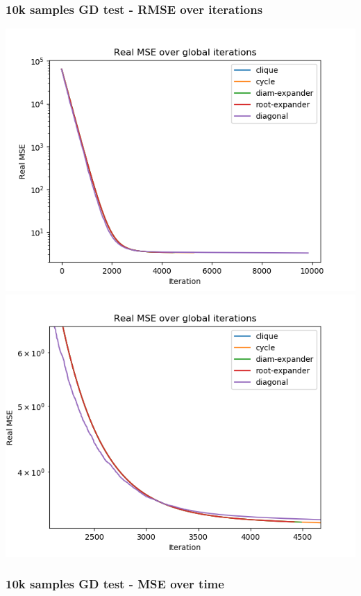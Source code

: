 \documentclass[11pt]{article}
\makeatletter
\def\maxwidth{\ifdim\Gin@nat@width>\linewidth\linewidth
    \else\Gin@nat@width\fi}
\let\Oldincludegraphics\includegraphics
\renewcommand{\includegraphics}[1]{\Oldincludegraphics[width=.8\maxwidth]{#1}}
\makeatother
\begin{document}
    \subsubsection{10k samples GD test - RMSE over
iterations}\label{k-samples-gd-test---rmse-over-iterations}

\includegraphics{media/img/tests/test_003_10ksamples_classic/2_real-mse_iter.png}
\includegraphics{media/img/tests/test_003_10ksamples_classic/2_real-mse_iter_zoom.png}

    \subsubsection{10k samples GD test - MSE over
time}\label{k-samples-gd-test---mse-over-time}
\end{document}
